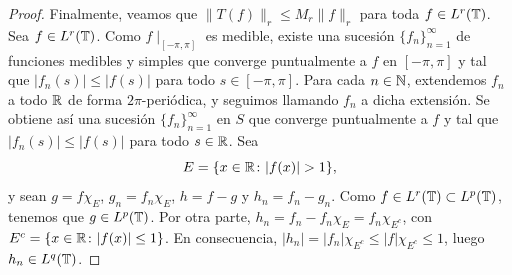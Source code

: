 \documentclass[a4paper, 12pt, oneside]{book}
\begin{document}
\begin{proof}
    Finalmente, veamos que $\|T(f)\|_r \leq M_r\|f\|_r$ para toda $f \in L^r(\mathbb T)$. Sea $f \in L^r(\mathbb T)$. Como $f\!\mid_{[-\pi,\pi]}$ es medible, existe una sucesión $\{f_n\}_{n=1}^\infty$ de funciones medibles y simples que converge puntualmente a $f$ en $[-\pi,\pi]$ y tal que $|f_n(s)|\leq |f(s)|$ para todo $s \in [-\pi,\pi]$. Para cada $n \in \mathbb N$, extendemos $f_n$ a todo $\mathbb R$ de forma $2\pi$-periódica, y seguimos llamando $f_n$ a dicha extensión. Se obtiene así una sucesión $\{f_n\}_{n=1}^\infty$ en $S$ que converge puntualmente a $f$ y tal que $|f_n(s)| \leq |f(s)|$ para todo $s \in \mathbb R$. Sea
    \[E = \{x \in \mathbb R \colon |f(x)| > 1\},\]
    y sean $g = f\chi_E$, $g_n = f_n\chi_E$, $h = f-g$ y $h_n = f_n-g_n$. Como $f \in L^r(\mathbb T) \subset L^p(\mathbb T)$, tenemos que $g \in L^p(\mathbb T)$. Por otra parte, $h_n = f_n-f_n\chi_{E} = f_n\chi_{E^c}$, con $E^c=\{x \in \mathbb R \colon |f(x)|\leq 1\}$. En consecuencia, $|h_n| =|f_n|\chi_{E^c} \leq |f|\chi_{E^c} \leq 1$, luego $h_n \in L^q(\mathbb T)$.


\end{proof}
\end{document}

